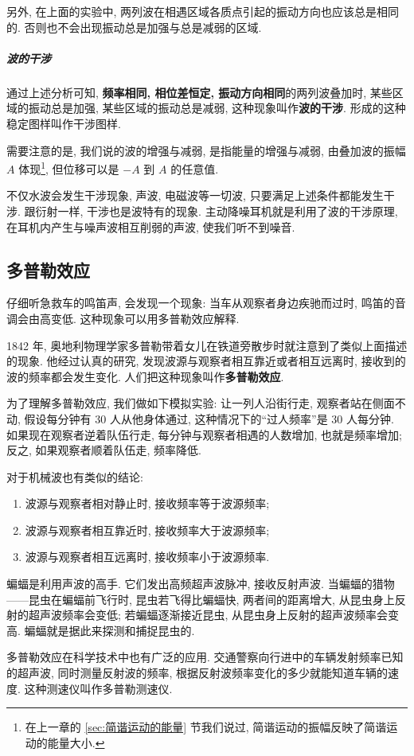 \documentclass[UTF8,openany,fontset=fandol]{ctexbook}
\theoremstyle{chinesetextbook}
\begin{document}
另外, 在上面的实验中, 两列波在相遇区域各质点引起的振动方向也应该总是相同的. 否则也不会出现振动总是加强与总是减弱的区域.

\subparagraph{波的干涉} 通过上述分析可知, \textbf{频率相同, 相位差恒定, 振动方向相同}的两列波叠加时, 某些区域的振动总是加强, 某些区域的振动总是减弱, 这种现象叫作\textbf{波的干涉}. 形成的这种稳定图样叫作干涉图样.

需要注意的是, 我们说的波的增强与减弱, 是指能量的增强与减弱, 由叠加波的振幅 $A$ 体现\footnote{在上一章的 \ref{sec:简谐运动的能量} 节我们说过, 简谐运动的振幅反映了简谐运动的能量大小.}, 但位移可以是 $-A$ 到 $A$ 的任意值.

不仅水波会发生干涉现象, 声波, 电磁波等一切波, 只要满足上述条件都能发生干涉. 跟衍射一样, 干涉也是波特有的现象. 主动降噪耳机就是利用了波的干涉原理, 在耳机内产生与噪声波相互削弱的声波, 使我们听不到噪音.
\subsection{多普勒效应}
仔细听急救车的鸣笛声, 会发现一个现象: 当车从观察者身边疾驰而过时, 鸣笛的音调会由高变低. 这种现象可以用多普勒效应解释.

1842 年, 奥地利物理学家多普勒带着女儿在铁道旁散步时就注意到了类似上面描述的现象. 他经过认真的研究, 发现波源与观察者相互靠近或者相互远离时, 接收到的波的频率都会发生变化. 人们把这种现象叫作\textbf{多普勒效应}.

为了理解多普勒效应, 我们做如下模拟实验: 让一列人沿街行走, 观察者站在侧面不动, 假设每分钟有 30 人从他身体通过, 这种情况下的“过人频率”是 30 人每分钟. 如果现在观察者逆着队伍行走, 每分钟与观察者相遇的人数增加, 也就是频率增加; 反之, 如果观察者顺着队伍走, 频率降低.

对于机械波也有类似的结论:
\begin{enumerate}
\item 波源与观察者相对静止时, 接收频率等于波源频率;
\item 波源与观察者相互靠近时, 接收频率大于波源频率;
\item 波源与观察者相互远离时, 接收频率小于波源频率.
\end{enumerate}

蝙蝠是利用声波的高手. 它们发出高频超声波脉冲, 接收反射声波. 当蝙蝠的猎物——昆虫在蝙蝠前飞行时, 昆虫若飞得比蝙蝠快, 两者间的距离增大, 从昆虫身上反射的超声波频率会变低; 若蝙蝠逐渐接近昆虫, 从昆虫身上反射的超声波频率会变高. 蝙蝠就是据此来探测和捕捉昆虫的.

多普勒效应在科学技术中也有广泛的应用. 交通警察向行进中的车辆发射频率已知的超声波, 同时测量反射波的频率, 根据反射波频率变化的多少就能知道车辆的速度. 这种测速仪叫作多普勒测速仪.
\end{document}
